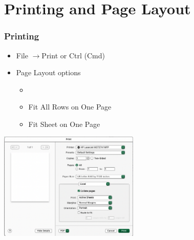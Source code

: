 \documentclass[12pt]{beamer}
\begin{document}
\section{Printing and Page Layout}
	\begin{frame}
		\frametitle{Printing}
		 \begin{itemize}
		 	\item File $\rightarrow$Print or Ctrl (Cmd)
			\item Page Layout options 
			\begin{itemize}
				\item 
				\item Fit All Rows on One Page 
				\item Fit Sheet on One Page
			\end{itemize}
		\end{itemize}
	\begin{center}
		\includegraphics[width=0.5\textwidth]{printmenu.png}
	\end{center}
	\end{frame}
\end{document}
